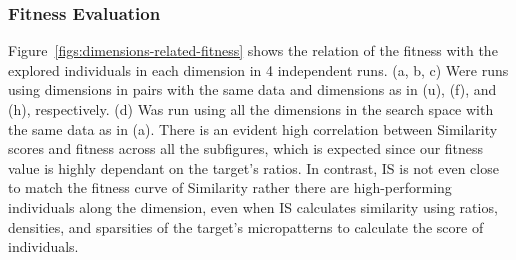 
\subsubsection{Fitness Evaluation} \label{sec:ERAFitness}

Figure~\ref{figs:dimensions-related-fitness} shows the relation of the fitness with the explored individuals in each dimension in 4 independent runs. (a, b, c) Were runs using dimensions in pairs with the same data and dimensions as in  (u), (f), and (h), respectively. (d) Was run using all the dimensions in the search space with the same data as in  (a). There is an evident high correlation between Similarity scores and fitness across all the subfigures, which is expected since our fitness value is highly dependant on the target's ratios. In contrast, IS is not even close to match the fitness curve of Similarity rather there are high-performing individuals along the dimension, even when IS calculates similarity using ratios, densities, and sparsities of the target's micropatterns to calculate the score of individuals. 



